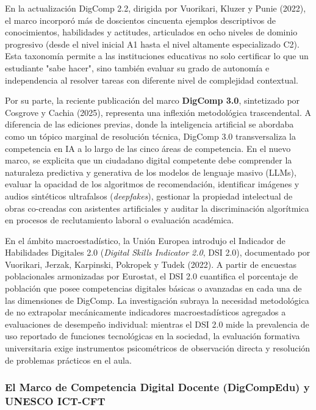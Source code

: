 En la actualización DigComp 2.2, dirigida por Vuorikari, Kluzer y Punie (2022), el marco incorporó más de doscientos cincuenta ejemplos descriptivos de conocimientos, habilidades y actitudes, articulados en ocho niveles de dominio progresivo (desde el nivel inicial A1 hasta el nivel altamente especializado C2). Esta taxonomía permite a las instituciones educativas no solo certificar lo que un estudiante "sabe hacer", sino también evaluar su grado de autonomía e independencia al resolver tareas con diferente nivel de complejidad contextual.

Por su parte, la reciente publicación del marco \textbf{DigComp 3.0}, sintetizado por Cosgrove y Cachia (2025), representa una inflexión metodológica trascendental. A diferencia de las ediciones previas, donde la inteligencia artificial se abordaba como un tópico marginal de resolución técnica, DigComp 3.0 transversaliza la competencia en IA a lo largo de las cinco áreas de competencia. En el nuevo marco, se explicita que un ciudadano digital competente debe comprender la naturaleza predictiva y generativa de los modelos de lenguaje masivo (LLMs), evaluar la opacidad de los algoritmos de recomendación, identificar imágenes y audios sintéticos ultrafalsos (\textit{deepfakes}), gestionar la propiedad intelectual de obras co-creadas con asistentes artificiales y auditar la discriminación algorítmica en procesos de reclutamiento laboral o evaluación académica.

En el ámbito macroestadístico, la Unión Europea introdujo el Indicador de Habilidades Digitales 2.0 (\textit{Digital Skills Indicator 2.0}, DSI 2.0), documentado por Vuorikari, Jerzak, Karpinski, Pokropek y Tudek (2022). A partir de encuestas poblacionales armonizadas por Eurostat, el DSI 2.0 cuantifica el porcentaje de población que posee competencias digitales básicas o avanzadas en cada una de las dimensiones de DigComp. La investigación subraya la necesidad metodológica de no extrapolar mecánicamente indicadores macroestadísticos agregados a evaluaciones de desempeño individual: mientras el DSI 2.0 mide la prevalencia de uso reportado de funciones tecnológicas en la sociedad, la evaluación formativa universitaria exige instrumentos psicométricos de observación directa y resolución de problemas prácticos en el aula.

\subsubsection{El Marco de Competencia Digital Docente (DigCompEdu) y UNESCO ICT-CFT}

